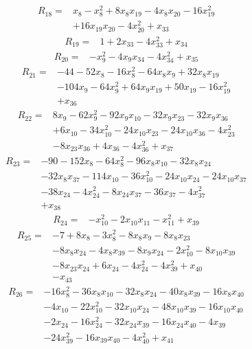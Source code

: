 \begin{align*} R_{18}={}&x_{8} -x_{8}^{2} +8 x_{8}x_{19} -4 x_{8}x_{20} -16 x_{19}^{2}
\\ &+16 x_{19}x_{20} -4 x_{20}^{2} +x_{33}
\end{align*}
\begin{align*} R_{19}={}&1 +2 x_{33} -4 x_{33}^{2} +x_{34}
\end{align*}
\begin{align*} R_{20}={}&-x_{9}^{2} -4 x_{9}x_{34} -4 x_{34}^{2} +x_{35}
\end{align*}
\begin{align*} R_{21}={}&-44 -52 x_{8} -16 x_{8}^{2} -64 x_{8}x_{9} +32 x_{8}x_{19}
\\ &-104 x_{9} -64 x_{9}^{2} +64 x_{9}x_{19} +50 x_{19} -16 x_{19}^{2}
\\ &+x_{36}
\end{align*}
\begin{align*} R_{22}={}&8 x_{9} -62 x_{9}^{2} -92 x_{9}x_{10} -32 x_{9}x_{23} -32 x_{9}x_{36}
\\ &+6 x_{10} -34 x_{10}^{2} -24 x_{10}x_{23} -24 x_{10}x_{36} -4 x_{23}^{2}
\\ &-8 x_{23}x_{36} +4 x_{36} -4 x_{36}^{2} +x_{37}
\end{align*}
\begin{align*} R_{23}={}&-90 -152 x_{8} -64 x_{8}^{2} -96 x_{8}x_{10} -32 x_{8}x_{24}
\\ &-32 x_{8}x_{37} -114 x_{10} -36 x_{10}^{2} -24 x_{10}x_{24} -24 x_{10}x_{37}
\\ &-38 x_{24} -4 x_{24}^{2} -8 x_{24}x_{37} -36 x_{37} -4 x_{37}^{2}
\\ &+x_{38}
\end{align*}
\begin{align*} R_{24}={}&-x_{10}^{2} -2 x_{10}x_{11} -x_{11}^{2} +x_{39}
\end{align*}
\begin{align*} R_{25}={}&-7 +8 x_{8} -3 x_{8}^{2} -8 x_{8}x_{9} -8 x_{8}x_{23}
\\ &-8 x_{8}x_{24} -4 x_{8}x_{39} -8 x_{9}x_{24} -2 x_{10}^{2} -8 x_{10}x_{39}
\\ &-8 x_{23}x_{24} +6 x_{24} -4 x_{24}^{2} -4 x_{39}^{2} +x_{40}
\\ &-x_{43}
\end{align*}
\begin{align*} R_{26}={}&-16 x_{8}^{2} -36 x_{8}x_{10} -32 x_{8}x_{24} -40 x_{8}x_{39} -16 x_{8}x_{40}
\\ &-4 x_{10} -22 x_{10}^{2} -32 x_{10}x_{24} -48 x_{10}x_{39} -16 x_{10}x_{40}
\\ &-2 x_{24} -16 x_{24}^{2} -32 x_{24}x_{39} -16 x_{24}x_{40} -4 x_{39}
\\ &-24 x_{39}^{2} -16 x_{39}x_{40} -4 x_{40}^{2} +x_{41}
\end{align*}
